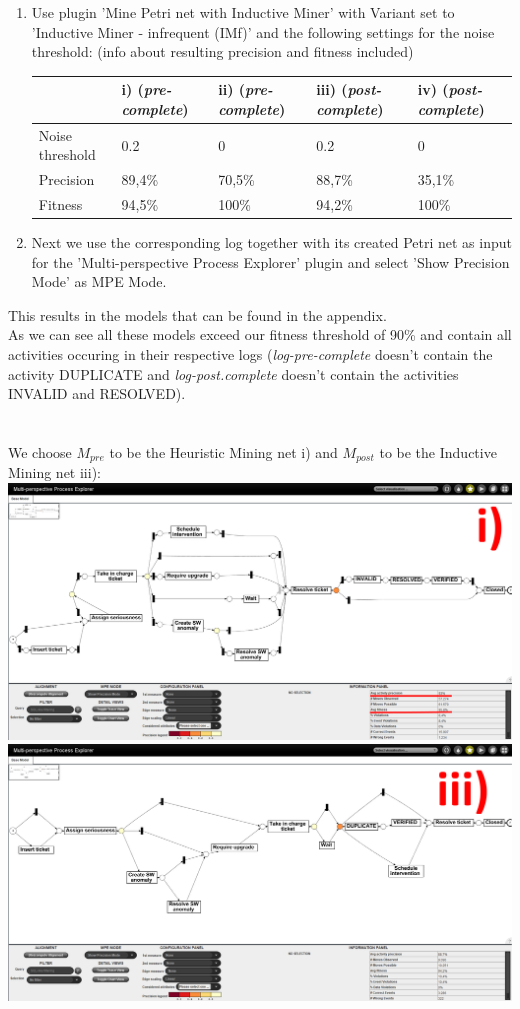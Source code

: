 \documentclass[../../main.tex]{subfiles}
\begin{document}
\begin{enumerate}
\item Use plugin 'Mine Petri net with Inductive Miner' with Variant set to 'Inductive Miner - infrequent (IMf)' and the following settings for the noise threshold: (info about resulting precision and fitness included)
\begin{table}[h!]
\begin{tabular}{l|llll}
           & i) (\textit{pre-complete}) & ii) (\textit{pre-complete}) & iii) (\textit{post-complete}) & iv) (\textit{post-complete})\\
           \hline
Noise threshold & 0.2 & 0 & 0.2 & 0 \\
\hline
Precision & 89,4\% & 70,5\% & 88,7\% & 35,1\% \\
Fitness   & 94,5\% & 100\%  & 94,2\% & 100\%  \\
\end{tabular}
\end{table}
\item Next we use the corresponding log together with its created Petri net as input for the 'Multi-perspective Process Explorer' plugin and select 'Show Precision Mode' as MPE Mode.
\end{enumerate}
This results in the models that can be found in the appendix.\\
As we can see all these models exceed our fitness threshold of 90\% and contain all activities occuring in their respective logs (\textit{log-pre-complete} doesn't contain the activity DUPLICATE and \textit{log-post.complete} doesn't contain the activities INVALID and RESOLVED).\\
\\ \ \\
We choose $M_{pre}$ to be the Heuristic Mining net i) and $M_{post}$ to be the Inductive Mining net iii):\\
\includegraphics[width=0.5\columnwidth]{Question_2/img/ProM_b_PRE_i.png}
\includegraphics[width=0.5\columnwidth]{Question_2/img/ProM_b_inductive_POST_iii.png}\\
\end{document}
